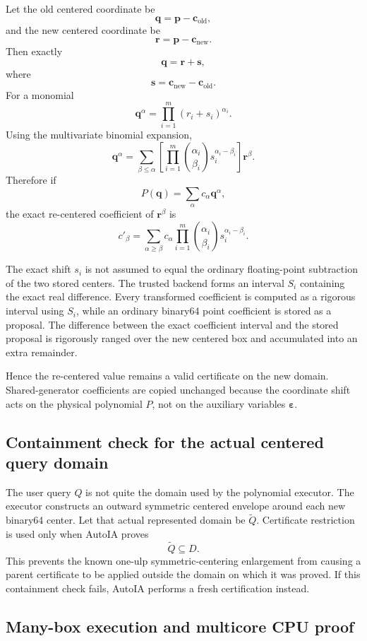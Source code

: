 \documentclass[11pt]{article}
\newcommand{\epsv}{\boldsymbol{\varepsilon}}
\newcommand{\qv}{\mathbf{q}}
\newcommand{\pv}{\mathbf{p}}
\begin{document}
Let the old centered coordinate be
\[
  \qv=\pv-\mathbf{c}_{\mathrm{old}},
\]
and the new centered coordinate be
\[
  \mathbf{r}=\pv-\mathbf{c}_{\mathrm{new}}.
\]
Then exactly
\[
  \qv=\mathbf{r}+\mathbf{s},
\]
where
\[
  \mathbf{s}=\mathbf{c}_{\mathrm{new}}-\mathbf{c}_{\mathrm{old}}.
\]
For a monomial
\[
  \qv^\alpha=\prod_{i=1}^m(r_i+s_i)^{\alpha_i}.
\]
Using the multivariate binomial expansion,
\[
  \qv^\alpha
  =
  \sum_{\beta\le\alpha}
  \left[
  \prod_{i=1}^m
  \binom{\alpha_i}{\beta_i}
  s_i^{\alpha_i-\beta_i}
  \right]
  \mathbf{r}^\beta.
\]
Therefore if
\[
  P(\qv)=\sum_\alpha c_\alpha\qv^\alpha,
\]
the exact re-centered coefficient of \(\mathbf{r}^\beta\) is
\[
  c'_\beta
  =
  \sum_{\alpha\ge\beta}
  c_\alpha
  \prod_{i=1}^m
  \binom{\alpha_i}{\beta_i}
  s_i^{\alpha_i-\beta_i}.
\]

The exact shift \(s_i\) is not assumed to equal the ordinary floating-point
subtraction of the two stored centers.  The trusted backend forms an interval
\(S_i\) containing the exact real difference.  Every transformed coefficient is
computed as a rigorous interval using \(S_i\), while an ordinary binary64 point
coefficient is stored as a proposal.  The difference between the exact coefficient
interval and the stored proposal is rigorously ranged over the new centered box
and accumulated into an extra remainder.

Hence the re-centered value remains a valid certificate on the new domain.
Shared-generator coefficients are copied unchanged because the coordinate shift
acts on the physical polynomial \(P\), not on the auxiliary variables \(\epsv\).

\subsection{Containment check for the actual centered query domain}

The user query \(Q\) is not quite the domain used by the polynomial executor.
The executor constructs an outward symmetric centered envelope around each new
binary64 center.  Let that actual represented domain be \(\widetilde Q\).
Certificate restriction is used only when AutoIA proves
\[
  \widetilde Q\subseteq D.
\]
This prevents the known one-ulp symmetric-centering enlargement from causing a
parent certificate to be applied outside the domain on which it was proved.  If
this containment check fails, AutoIA performs a fresh certification instead.

\subsection{Many-box execution and multicore CPU proof}
\end{document}
